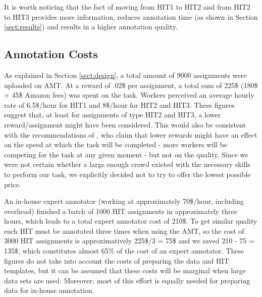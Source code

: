 \documentclass[11pt]{elsarticle}
\begin{document}
It is worth noticing that the fact of moving from HIT1 to HIT2 and from HIT2 to HIT3 provides more information, reduces annotation time (as shown in Section \ref{sect:results}) and results in a higher annotation quality.


\subsection{Annotation Costs}
\label{sect:costs}

As explained in Section \ref{sect:design}, a total amount of 9000 assignments were uploaded on AMT. At a reward of .02\$ per assignment, a total sum of 225\$ (180\$ + 45\$ Amazon fees) was spent on the task. Workers perceived an average hourly rate of 6.5\$/hour for HIT1 and 8\$/hour for HIT2 and HIT3. These figures suggest that, at least for assignments of type HIT2 and HIT3, a lower reward/assignment might have been considered. This would also be consistent with the recommendations of \cite{mason_financial_2009}, who claim that lower rewards might have an effect on the speed at which the task will be completed - more workers will be competing for the task at any given moment - but not on the quality. Since we were not certain whether a large enough crowd existed with the necessary skills to perform our task, we explicitly decided not to try to offer the lowest possible price.



An in-house expert annotator (working at approximately 70\$/hour, including overhead) finished a batch of 1000 HIT assignments in approximately three hours, which leads to a total expert annotator cost of 210\$. To get similar quality each HIT must be annotated three times when using the AMT, so the cost of 3000 HIT assignments is approximatively 225\$/3 = 75\$ and we saved 210 - 75 = 135\$, which constitutes almost 65\% of the cost of an expert annotator. These figures do not take into account the costs of preparing the data and HIT templates, but it can be assumed that these costs will be marginal when large data sets are used. Moreover, most of this effort is equally needed for preparing data for in-house annotation.
\end{document}
